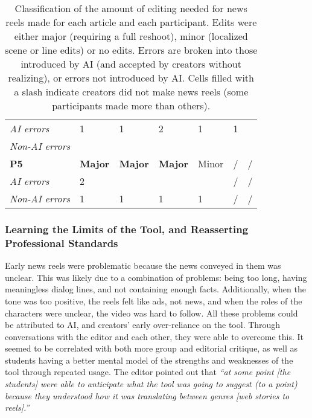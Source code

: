 \begin{table}
\begin{adjustbox}{width=0.48\textwidth}
\begin{tabular}{|l|l|l|l|l|l|l|}
\textit{AI errors}   & 1                  & 1                  & 2                  & 1                  & 1                  &                    \\ 
\textit{Non-AI errors} &                  &                    &                    &                    &                    &                    \\ \hline
\textbf{P5}        & \color{red}\textbf{Major}\color{black}               & \color{red}\textbf{Major}\color{black}               & \color{red}\textbf{Major}\color{black}               & Minor              &     /               &              /     \\ \hline
\textit{AI errors}   & 2                  &                    &                    &                    &     /               &      /              \\ 
\textit{Non-AI errors} & 1                & 1                  & 1                  & 1                  &      /              &      /              \\ \hline
\end{tabular}
\end{adjustbox}
\caption{Classification of the amount of editing needed for news reels made for each article and each participant. Edits were either major (requiring a full reshoot), minor (localized scene or line edits) or no edits. Errors are broken into those introduced by AI (and accepted by creators without realizing), or errors not introduced by AI. Cells filled with a slash indicate creators did not make news reels (some participants made more than others).}
\label{learning_edits}
\end{table}

\subsubsection{Learning the Limits of the Tool, and Reasserting Professional Standards}
Early news reels were problematic because the news conveyed in them was unclear.
This was likely due to a combination of problems: being too long, having meaningless dialog lines, and not containing enough facts. 
Additionally, when the tone was too positive, the reels felt like ads, not news, and when the roles of the characters were unclear, the video was hard to follow. 
All these problems could be attributed to AI, and creators' early over-reliance on the tool. 
Through conversations with the editor and each other, they were able to overcome this. 
It seemed to be correlated with both more group and editorial critique, as well as students having a better mental model of the strengths and weaknesses of the tool through repeated usage. 
The editor pointed out that \textit{``at some point [the students] were able to anticipate what the tool was going to suggest (to a point) because they understood how it was translating between genres [web stories to reels].''} 

